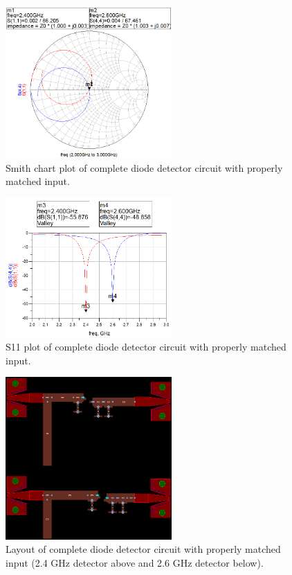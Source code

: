 \documentclass[conference]{IEEEtran}
\begin{document}
\begin{figure}[!htb]
\centering
\includegraphics[width=2.5in]{diode-pics/diodedetectorSmithmatched-final.png}
\caption{Smith chart plot of complete diode detector circuit with properly matched input.}
\label{fig:FinalDDSmith}
\end{figure}

\begin{figure}[!htb]
\centering
\includegraphics[width=2.5in]{diode-pics/diodedetectorS11matched-final.png}
\caption{S11 plot of complete diode detector circuit with properly matched input.}
\label{fig:FinalDDS11}
\end{figure}

\begin{figure}[!htb]
\centering
\includegraphics[width=2.5in]{diode-pics/diodedetectorlayout.png}
\caption{Layout of complete diode detector circuit with properly matched input (2.4 GHz detector above and 2.6 GHz detector below).}
\label{fig:FinalDDLayout}
\end{figure}
\end{document}
